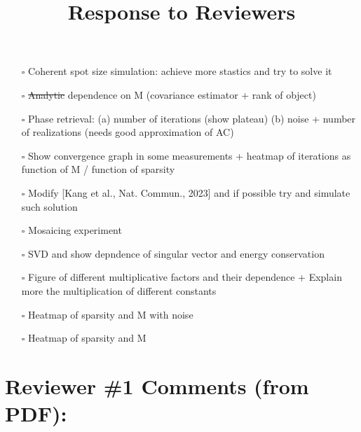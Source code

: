 \documentclass[12pt]{article}
\begin{document}
\begin{itemize}

\item[\rlap{\raisebox{0.3ex}{\hspace{0.4ex}\scriptsize \ding{51}}}$\square$]
Coherent spot size simulation: achieve more stastics and try to solve it
\item[\rlap{\raisebox{0.3ex}{\hspace{0.4ex}\scriptsize \ding{51}}}$\square$]
\st{Analytic} dependence on M (covariance estimator + rank of object) 

\item[\rlap{\raisebox{0.3ex}{\hspace{0.4ex}\scriptsize \ding{51}}}$\square$]
Phase retrieval: (a) number of iterations (show plateau) (b) noise + number of realizations (needs good approximation of AC)
\item[\rlap{\raisebox{0.3ex}{\hspace{0.4ex}\scriptsize \ding{51}}}$\square$]
Show convergence graph in some measurements + heatmap of iterations as function of M / function of sparsity
\item[$\square$]
Modify [Kang et al., Nat. Commun., 2023] and if possible try and simulate such solution

\item[$\square$]
Mosaicing experiment

\item[$\square$]
SVD and show depndence of singular vector and energy conservation

\item[$\square$]
Figure of different multiplicative factors and their dependence + Explain more the multiplication of different constants 

\item[\rlap{\raisebox{0.3ex}{\hspace{0.4ex}\scriptsize \ding{51}}}$\square$]
Heatmap of sparsity and M with noise
\item[\rlap{\raisebox{0.3ex}{\hspace{0.4ex}\scriptsize \ding{51}}}$\square$]
Heatmap of sparsity and M

\end{itemize}
\newpage
\title{Response to Reviewers}


\section{Reviewer \#1 Comments (from PDF):}
\end{document}
